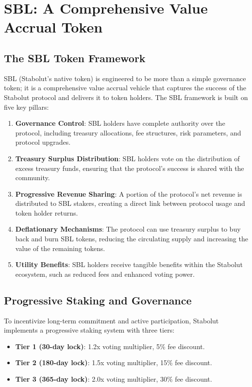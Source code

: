 \section{SBL: A Comprehensive Value Accrual Token}

\subsection{The SBL Token Framework}
SBL (Stabolut's native token) is engineered to be more than a simple governance token; it is a comprehensive value accrual vehicle that captures the success of the Stabolut protocol and delivers it to token holders. The SBL framework is built on five key pillars:

\begin{enumerate}
    \item \textbf{Governance Control}: SBL holders have complete authority over the protocol, including treasury allocations, fee structures, risk parameters, and protocol upgrades.
    \item \textbf{Treasury Surplus Distribution}: SBL holders vote on the distribution of excess treasury funds, ensuring that the protocol's success is shared with the community.
    \item \textbf{Progressive Revenue Sharing}: A portion of the protocol's net revenue is distributed to SBL stakers, creating a direct link between protocol usage and token holder returns.
    \item \textbf{Deflationary Mechanisms}: The protocol can use treasury surplus to buy back and burn SBL tokens, reducing the circulating supply and increasing the value of the remaining tokens.
    \item \textbf{Utility Benefits}: SBL holders receive tangible benefits within the Stabolut ecosystem, such as reduced fees and enhanced voting power.
\end{enumerate}

\subsection{Progressive Staking and Governance}
To incentivize long-term commitment and active participation, Stabolut implements a progressive staking system with three tiers:

\begin{itemize}
    \item \textbf{Tier 1 (30-day lock)}: 1.2x voting multiplier, 5\% fee discount.
    \item \textbf{Tier 2 (180-day lock)}: 1.5x voting multiplier, 15\% fee discount.
    \item \textbf{Tier 3 (365-day lock)}: 2.0x voting multiplier, 30\% fee discount.
\end{itemize}

